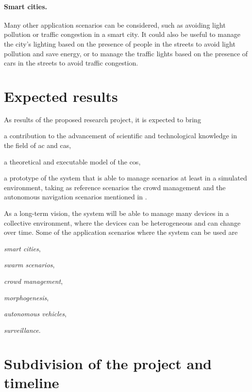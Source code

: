 \documentclass[12pt, a4paper]{article}
\newenvironment{inlinelist}{\begin{enumerate*}[label=\emph{(\roman*)}]}{\end{enumerate*}}
\begin{document}
\sloppypar
\paragraph{Smart cities.}
Many other application scenarios can be considered,
such as avoiding light pollution or traffic congestion in a smart city.
%
It could also be useful to manage the city's lighting based on the presence of people in the streets to avoid light pollution and save energy,
or to manage the traffic lights based on the presence of cars in the streets to avoid traffic congestion.

\section{Expected results}
\label{sec:expected-results}

As results of the proposed research project,
it is expected to bring
\begin{inlinelist}
    \item a contribution to the advancement of scientific and technological knowledge in the field of \ac{ac} and \ac{cas},
    \item a theoretical and executable model of the \ac{cos},
    \item a prototype of the system that is able to manage scenarios at least in a simulated environment,
    taking as reference scenarios the crowd management and the autonomous navigation scenarios mentioned in .
\end{inlinelist}

As a long-term vision,
the system will be able to manage many devices in a collective environment,
where the devices can be heterogeneous and can change over time.
%
Some of the application scenarios where the system can be used are
\begin{inlinelist}
    \item \emph{smart cities},
    \item \emph{swarm scenarios},
    \item \emph{crowd management},
    \item \emph{morphogenesis},
    \item \emph{autonomous vehicles},
    \item \emph{surveillance}.
\end{inlinelist}

\section{Subdivision of the project and timeline}
\label{sec:subdivision-of-the-project-and-timeline}
\end{document}
